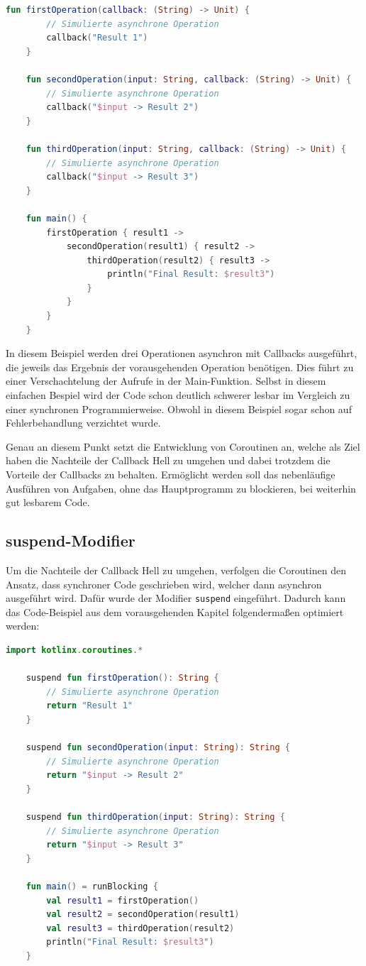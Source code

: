 \documentclass[fontsize=12pt,paper=a4,twoside=semi,parskip=half-,headsepline,headinclude]{scrreprt}
\begin{document}
\begin{lstlisting}[language=Kotlin]
	fun firstOperation(callback: (String) -> Unit) {
		// Simulierte asynchrone Operation
		callback("Result 1")
	}
	
	fun secondOperation(input: String, callback: (String) -> Unit) {
		// Simulierte asynchrone Operation
		callback("$input -> Result 2")
	}
	
	fun thirdOperation(input: String, callback: (String) -> Unit) {
		// Simulierte asynchrone Operation
		callback("$input -> Result 3")
	}
	
	fun main() {
		firstOperation { result1 ->
			secondOperation(result1) { result2 ->
				thirdOperation(result2) { result3 ->
					println("Final Result: $result3")
				}
			}
		}
	}
\end{lstlisting}

In diesem Beispiel werden drei Operationen asynchron mit Callbacks ausgeführt, die jeweils das Ergebnis der vorausgehenden Operation benötigen. Dies führt zu einer Verschachtelung der Aufrufe in der Main-Funktion. Selbst in diesem einfachen Bespiel wird der Code schon deutlich schwerer lesbar im Vergleich zu einer synchronen Programmierweise. Obwohl in diesem Beispiel sogar schon auf Fehlerbehandlung verzichtet wurde.

Genau an diesem Punkt setzt die Entwicklung von Coroutinen an, welche als Ziel haben die Nachteile der Callback Hell zu umgehen und dabei trotzdem die Vorteile der Callbacks zu behalten\cite{Elizarov2017a}. Ermöglicht werden soll das nebenläufige Ausführen von Aufgaben, ohne das Hauptprogramm zu blockieren, bei weiterhin gut lesbarem Code.


\subsection{suspend-Modifier}
\label{subsec:suspend}

Um die Nachteile der Callback Hell zu umgehen, verfolgen die Coroutinen den Ansatz, dass synchroner Code geschrieben wird, welcher dann asynchron ausgeführt wird. Dafür wurde der Modifier \texttt{suspend} eingeführt\cite{Akhin2024}. Dadurch kann das Code-Beispiel aus dem vorausgehenden Kapitel folgendermaßen optimiert werden:

\begin{lstlisting}[language=Kotlin]
	import kotlinx.coroutines.*
	
	suspend fun firstOperation(): String {
		// Simulierte asynchrone Operation
		return "Result 1"
	}
	
	suspend fun secondOperation(input: String): String {
		// Simulierte asynchrone Operation
		return "$input -> Result 2"
	}
	
	suspend fun thirdOperation(input: String): String {
		// Simulierte asynchrone Operation
		return "$input -> Result 3"
	}
	
	fun main() = runBlocking {
		val result1 = firstOperation()
		val result2 = secondOperation(result1)
		val result3 = thirdOperation(result2)
		println("Final Result: $result3")
	}
\end{lstlisting}
\end{document}
